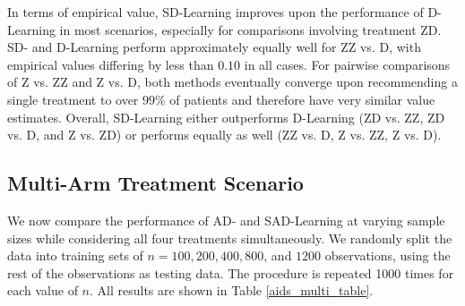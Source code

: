 \documentclass[useAMS,usenatbib]{biom}
\begin{document}



In terms of empirical value, SD-Learning improves upon the performance of D-Learning in most scenarios, especially for comparisons involving treatment ZD. SD- and D-Learning perform approximately equally well for ZZ vs. D, with empirical values differing by less than $0.10$ in all cases. For pairwise comparisons of Z vs. ZZ and Z vs. D, both methods eventually converge upon recommending a single treatment to over $99\%$ of patients and therefore have very similar value estimates. Overall, SD-Learning either outperforms D-Learning (ZD vs. ZZ, ZD vs. D, and Z vs. ZD) or performs equally as well (ZZ vs. D, Z vs. ZZ, Z vs. D).

\subsection{Multi-Arm Treatment Scenario} \label{subsec_data_multi}

We now compare the performance of AD- and SAD-Learning at varying sample sizes while considering all four treatments simultaneously. We randomly split the data into training sets of $n = 100, 200, 400, 800$, and $1200$ observations, using the rest of the observations as testing data. The procedure is repeated 1000 times for each value of $n$. All results are shown in Table \ref{aids_multi_table}.
\end{document}
